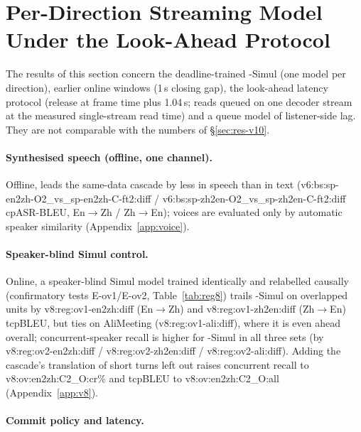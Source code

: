 \section{Per-Direction Streaming Model Under the Look-Ahead Protocol}
\label{app:v9proto}

The results of this section concern the deadline-trained \sys{}-Simul (one model per direction), earlier online windows
(1\,s closing gap), the look-ahead latency protocol (release at frame time plus 1.04\,s; reads queued on one decoder
stream at the measured single-stream read time) and a queue model of listener-side lag. They are not comparable with the
numbers of \S\ref{sec:res-v10}.



\paragraph{Synthesised speech (offline, one channel).} Offline, \sys{} leads the same-data cascade by less in speech than in
text (\num{v6:bs:sp-en2zh-O2_vs_sp-en2zh-C-ft2:diff} / \num{v6:bs:sp-zh2en-O2_vs_sp-zh2en-C-ft2:diff} cpASR-BLEU,
En$\rightarrow$Zh / Zh$\rightarrow$En); voices are evaluated only by automatic speaker similarity
(Appendix~\ref{app:voice}).

\paragraph{Speaker-blind Simul control.} Online, a speaker-blind Simul model trained identically and relabelled causally
(confirmatory tests E-ov1/E-ov2, Table~\ref{tab:reg8}) trails \sys{}-Simul on overlapped units by
\num{v8:reg:ov1-en2zh:diff} (En$\rightarrow$Zh) and \num{v8:reg:ov1-zh2en:diff} (Zh$\rightarrow$En) tcpBLEU, but ties on
AliMeeting (\num{v8:reg:ov1-ali:diff}), where it is even ahead overall; concurrent-speaker recall is higher for
\sys{}-Simul in all three sets (by \num{v8:reg:ov2-en2zh:diff} / \num{v8:reg:ov2-zh2en:diff} /
\num{v8:reg:ov2-ali:diff}). Adding the cascade's translation of short turns \sys{} left out raises concurrent recall to
\num{v8:ov:en2zh:C2_O:cr}\% and tcpBLEU to \num{v8:ov:en2zh:C2_O:all} (Appendix~\ref{app:v8}).

\paragraph{Commit policy and latency.}
\label{sec:res-simul}
\label{sec:res-latency}

